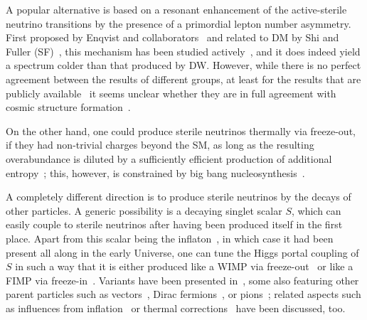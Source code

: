 A popular alternative is based on a resonant enhancement of the active-sterile neutrino transitions by the presence of a primordial lepton number asymmetry. First proposed by Enqvist and collaborators~\cite{Enqvist:1990ek} and related to DM by Shi and Fuller (SF)~\cite{Shi:1998km}, this mechanism has been studied actively~\cite{Abazajian:2001nj,Laine:2008pg,Kishimoto:2008ic,Canetti:2012kh,Abazajian:2014gza,Ghiglieri:2015jua,Venumadhav:2015pla}, and it does indeed yield a spectrum colder than that produced by DW. However, while there is no perfect agreement between the results of different groups, at least for the results that are publicly available~\cite{Abazajian:2001nj,Abazajian:2014gza,Venumadhav:2015pla} it seems unclear whether they are in full agreement with cosmic structure formation~\cite{Merle:2014xpa,Horiuchi:2015qri,Schneider:2016uqi}.

On the other hand, one could produce sterile neutrinos thermally via freeze-out, if they had non-trivial charges beyond the SM, as long as the resulting overabundance is diluted by a sufficiently efficient production of additional entropy~\cite{Bezrukov:2009th,Nemevsek:2012cd,Patwardhan:2015kga}; this, however, is constrained by big bang nucleosynthesis~\cite{King:2012wg}.

A completely different direction is to produce sterile neutrinos by the decays of other particles. A generic possibility is a decaying singlet scalar $S$, which can easily couple to sterile neutrinos after having been produced itself in the first place. Apart from this scalar being the inflaton~\cite{Shaposhnikov:2006xi,Bezrukov:2009yw,Bezrukov:2014nza}, in which case it had been present all along in the early Universe, one can tune the Higgs portal coupling of $S$ in such a way that it is either produced like a WIMP via freeze-out~\cite{Kusenko:2006rh,Petraki:2007gq,Kusenko:2009up} or like a FIMP via freeze-in~\cite{Merle:2013wta,Merle:2015oja}. Variants have been presented in~\cite{Klasen:2013ypa,Kang:2014cia,Frigerio:2014ifa,Adulpravitchai:2014xna,Humbert:2015epa,Ayazi:2015jij,McDonald:2015ljz,Adulpravitchai:2015mna,Shakya:2015xnx,Kaneta:2016vkq}, some also featuring other parent particles such as vectors~\cite{Boyanovsky:2008nc,Shuve:2014doa,Biswas:2016bfo}, Dirac fermions~\cite{Abada:2014zra}, or pions~\cite{Lello:2014yha,Lello:2015uma}; related aspects such as influences from inflation~\cite{Nurmi:2015ema} or thermal corrections~\cite{Drewes:2015eoa} have been discussed, too. 

